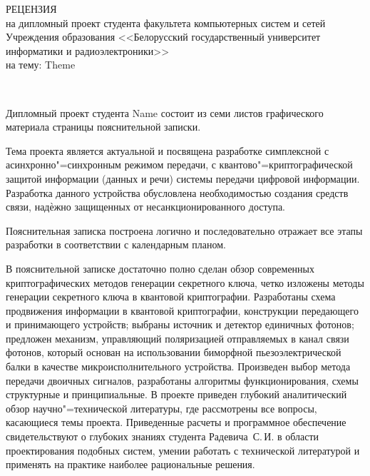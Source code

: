 \documentclass[]{lib/styles/additional-docs}
\begin{document}
\begin{singlespace}
  {\small
    \begin{center}
      \begin{minipage}{0.9\textwidth}
        \begin{center}
          {РЕЦЕНЗИЯ}\\[0.2cm]
          на дипломный проект студента факультета компьютерных систем и сетей Учреждения образования <<Белорусский государственный университет информатики и радиоэлектроники>>\\
          на тему: Theme 
        \end{center}
      \end{minipage}\\
    \end{center}
  
  Дипломный проект студента Name состоит из семи листов графического материала страницы пояснительной записки.
  
  Тема проекта является актуальной и посвящена разработке симплексной с асинхронно"=синхронным режимом передачи, с квантово"=криптографической защитой информации (данных и речи) системы передачи цифровой информации. 
  Разработка данного устройства обусловлена необходимостью создания средств связи, надѐжно защищенных от несанкционированного доступа.
  
  Пояснительная записка построена логично и последовательно отражает все этапы разработки в соответствии с календарным планом.
  
  В пояснительной записке достаточно полно сделан обзор современных криптографических методов генерации секретного ключа, четко изложены методы генерации секретного
  ключа в квантовой криптографии.
  Разработаны схема продвижения информации в квантовой криптографии, конструкции передающего и принимающего устройств; выбраны источник и детектор единичных фотонов; предложен механизм, управляющий поляризацией отправляемых в канал связи фотонов, который основан на использовании биморфной пьезоэлектрической балки в качестве микроисполнительного устройства. 
  Произведен выбор метода передачи двоичных сигналов, разработаны алгоритмы функционирования, схемы структурные и принципиальные.
  В проекте приведен глубокий аналитический обзор научно"=технической литературы, где рассмотрены все вопросы, касающиеся темы проекта.
  Приведенные расчеты и программное обеспечение свидетельствуют о глубоких знаниях студента Радевича~С.\,И. в области проектирования подобных систем, умении работать с технической литературой и применять на практике наиболее рациональные решения.
  
}
\end{singlespace}
\end{document}
